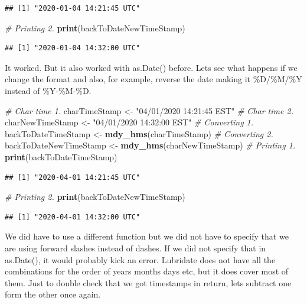 \documentclass[]{book}
\newenvironment{Shaded}{\begin{snugshade}}{\end{snugshade}}
\newcommand{\CommentTok}[1]{\textcolor[rgb]{0.56,0.35,0.01}{\textit{#1}}}
\newcommand{\KeywordTok}[1]{\textcolor[rgb]{0.13,0.29,0.53}{\textbf{#1}}}
\newcommand{\NormalTok}[1]{#1}
\newcommand{\StringTok}[1]{\textcolor[rgb]{0.31,0.60,0.02}{#1}}
\begin{document}
\begin{verbatim}
## [1] "2020-01-04 14:21:45 UTC"
\end{verbatim}

\begin{Shaded}
\begin{Highlighting}[]
\CommentTok{# Printing 2.}
\KeywordTok{print}\NormalTok{(backToDateNewTimeStamp)}
\end{Highlighting}
\end{Shaded}

\begin{verbatim}
## [1] "2020-01-04 14:32:00 UTC"
\end{verbatim}

It worked. But it also worked with as.Date() before. Lets see what happens if we change the format and also, for example, reverse the date making it \%D/\%M/\%Y instead of \%Y-\%M-\%D.

\begin{Shaded}
\begin{Highlighting}[]
\CommentTok{# Char time 1.}
\NormalTok{charTimeStamp <-}\StringTok{ "04/01/2020 14:21:45 EST"}
\CommentTok{# Char time 2.}
\NormalTok{charNewTimeStamp <-}\StringTok{ "04/01/2020 14:32:00 EST"}
\CommentTok{# Converting 1.}
\NormalTok{backToDateTimeStamp <-}\StringTok{ }\KeywordTok{mdy_hms}\NormalTok{(charTimeStamp)}
\CommentTok{# Converting 2.}
\NormalTok{backToDateNewTimeStamp <-}\StringTok{ }\KeywordTok{mdy_hms}\NormalTok{(charNewTimeStamp)}
\CommentTok{# Printing 1.}
\KeywordTok{print}\NormalTok{(backToDateTimeStamp)}
\end{Highlighting}
\end{Shaded}

\begin{verbatim}
## [1] "2020-04-01 14:21:45 UTC"
\end{verbatim}

\begin{Shaded}
\begin{Highlighting}[]
\CommentTok{# Printing 2.}
\KeywordTok{print}\NormalTok{(backToDateNewTimeStamp)}
\end{Highlighting}
\end{Shaded}

\begin{verbatim}
## [1] "2020-04-01 14:32:00 UTC"
\end{verbatim}

We did have to use a different function but we did not have to specify that we are using forward slashes instead of dashes. If we did not specify that in as.Date(), it would probably kick an error. Lubridate does not have all the combinations for the order of years months days etc, but it does cover most of them. Just to double check that we got timestamps in return, lets subtract one form the other once again.
\end{document}
